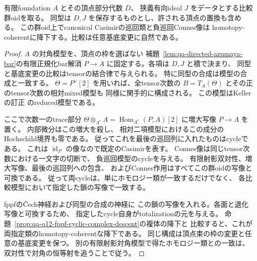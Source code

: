 \begin{proposition}
\label{prop:qa-foundation-casimir-chain-descent}
有限foundation $A$ とその頂点部分代数 $D$、
狭義有向ideal $J$ をデータとする比較群oidを取る。
同型は $D,J$ を保存するものとし、許される頂点の置換も含める。
この群oid上でcanonical Casimirの巡回類と負巡回Connes像は
homotopy-coherentに降下する。比較は任意基底変更に自然である。
\end{proposition}
\begin{proof}
$A$ の対角模型を、頂点の枠を選ばない
補題~\ref{lem:qa-directed-azumaya-bar}の有限正規化bar解消
$P\to A$ に固定する。各項は $D,J$ と積で決まり、
同型と基底変更の比較はtensorの結合律で与えられる。
特に同型の合成は模型の合成と一致する。
$\Theta=P^\vee[2]$ を用いれば、全tensor次数の
$B=T_A(\Theta)$ とその正のtensor次数の相対mixed模型も
同様に関手的に構成される。
この模型はKellerの訂正
\cite[Theorem~1.1の証明]{KellerErratumCY2018}
のreduced模型である。

ここで次数一のtrace部分
$\Theta\otimes_{A^e} A=\operatorname{Hom}_{A^e}(P,A)[2]$
に増大写像 $P\to A$ を置く。
内部微分はこの増大を殺し、
相対二項模型におけるこの成分のHochschild境界も零である。
従ってこれを最後の巡回列に入れたものはcycleである。
これは $\operatorname{id}_P$ の像なので既定のCasimirを表す。
Connes像は同じtensor次数における一文字の切断で、
負巡回模型のcycleを与える。
有限射影双対性、増大写像、最後の巡回列への包含、
およびConnes作用はすべてこの群oidの写像と可換である。
従って両cycleは、単にホモロジー類が一致するだけでなく、
各比較模型において指定した鎖の写像で一致する。

fppfの\v{C}ech神経および同型の合成の神経に
この鎖の写像を入れる。各面と退化写像と可換するため、
指定したcycle自身がtotalizationの元を与える。
命題~\ref{prop:qa-q12-fppf-cyclic-complex-descent}の複体の降下と
比較すると、これが両指定類のhomotopy-coherentな降下である。
同じ構成は頂点束の枠の変更と任意の基底変更を保つ。
別の有限射影対角模型で得たホモロジー類との一致は、
双対性で対角の恒等射を追うことで従う。
\end{proof}

